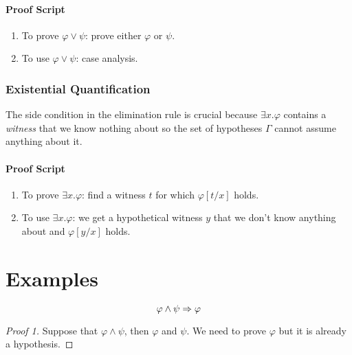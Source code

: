 \documentclass{amsart}
\begin{document}
\paragraph{Proof Script}
\begin{enumerate}
\item To prove $\varphi \vee \psi$: prove either $\varphi$ or $\psi$.
\item To use $\varphi \vee \psi$: case analysis.
\end{enumerate}

\subsubsection{Existential Quantification}
\label{sec:existential-quantification}

The side condition in the elimination rule is crucial because $\exists x.\varphi$ contains a \emph{witness} that we know nothing about so the set of hypotheses $\Gamma$ cannot assume anything about it.

\paragraph{Proof Script}
\begin{enumerate}
\item To prove $\exists x.\varphi$: find a witness $t$ for which $\varphi[t/x]$ holds.
\item To use $\exists x.\varphi$: we get a hypothetical witness $y$ that we don't know anything about and $\varphi[y/x]$ holds.
\end{enumerate}

\section{Examples}
\label{sec:examples}

\begin{eg}
  \[
    \varphi \wedge \psi \Rightarrow \varphi
  \]
\end{eg}
\begin{proof}[Proof 1]
  Suppose that $\varphi \wedge \psi$, then $\varphi$ and $\psi$.
  We need to prove $\varphi$ but it is already a hypothesis.
\end{proof}
\end{document}
